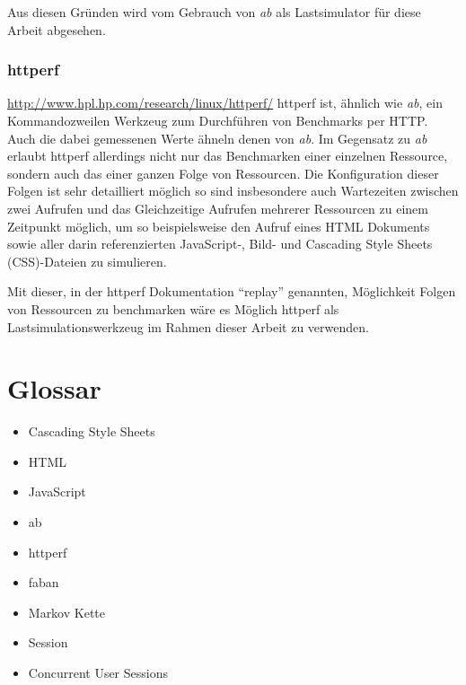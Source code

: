 \documentclass[1p]{scrartcl}
\begin{document}
  Aus diesen Gründen wird vom Gebrauch von \textit{ab} als Lastsimulator für diese Arbeit
  abgesehen.
  
  \subsubsection{httperf}
  \url{http://www.hpl.hp.com/research/linux/httperf/}
  httperf ist, ähnlich wie \textit{ab}, ein Kommandozweilen Werkzeug zum
  Durchführen von Benchmarks per HTTP. Auch die dabei gemessenen Werte ähneln
  denen von \textit{ab}. Im Gegensatz zu \textit{ab} erlaubt httperf allerdings
  nicht nur das Benchmarken einer einzelnen Ressource, sondern auch das einer
  ganzen Folge von Ressourcen. Die Konfiguration dieser Folgen ist sehr 
  detailliert möglich so sind insbesondere auch Wartezeiten zwischen zwei 
  Aufrufen und das Gleichzeitige Aufrufen mehrerer Ressourcen zu einem Zeitpunkt
  möglich, um so beispielsweise den Aufruf eines HTML Dokuments sowie aller
  darin referenzierten JavaScript-, Bild- und 
  Cascading Style Sheets (CSS)-Dateien zu simulieren.
  
  Mit dieser, in der httperf Dokumentation ``replay'' genannten,
  Möglichkeit Folgen von Ressourcen zu benchmarken wäre es Möglich httperf als
  Lastsimulationswerkzeug im Rahmen dieser Arbeit zu verwenden.
  
    
  \section{Glossar}
  \begin{itemize}
    \item Cascading Style Sheets
    \item HTML
    \item JavaScript
    \item ab
    \item httperf
    \item faban
    \item Markov Kette
    \item Session
    \item Concurrent User Sessions
  \end{itemize}
\end{document}
